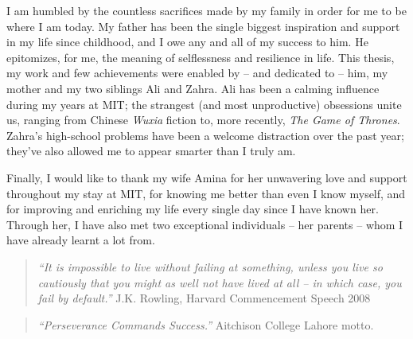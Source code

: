 I am humbled by the countless sacrifices made by my family in order for me to be where I am today. 
My father has been the single biggest inspiration and support in my life since childhood, 
and I owe any and all of my success to him. He epitomizes, for me, the meaning of selflessness and resilience in life. 
This thesis, my work and few achievements were enabled by -- and dedicated to -- him, my mother and my two siblings Ali 
and Zahra. Ali has been a calming influence during my years at MIT; the strangest
(and most unproductive) obsessions unite us, ranging from Chinese \emph{Wuxia} fiction to,
more recently, \emph{The Game of Thrones}. Zahra's high-school problems
have been a welcome distraction over the past year; they've also allowed me to appear
smarter than I truly am.

Finally, I would like to thank my wife Amina for her unwavering love and support throughout my stay at MIT, 
for knowing me better than even I know myself, and for improving and enriching my life every 
single day since I have known her. Through her, I have also met two exceptional individuals -- her parents --  
whom I have already learnt a lot from.  \newline 

\begin{quote}
\emph{``It is impossible to live without failing at something, unless you live so cautiously that you might as well not have
lived at all -- in which case, you fail by default.''} \newline
J.K. Rowling, Harvard Commencement Speech 2008
\end{quote}

\begin{quote}
\emph{``Perseverance Commands Success.''} \newline
Aitchison College Lahore motto.
\end{quote}

